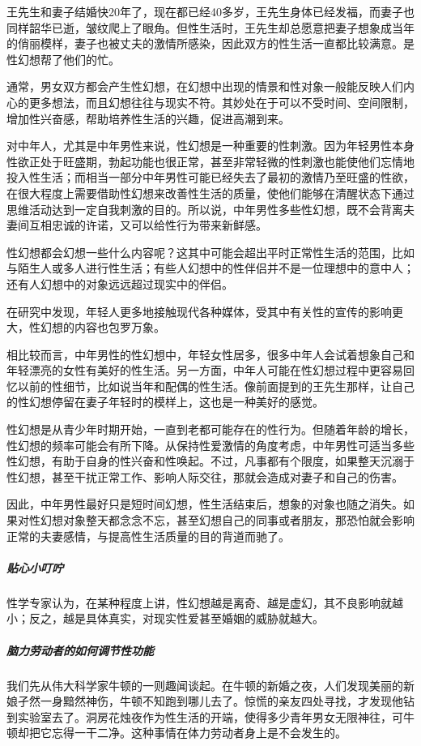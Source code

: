 王先生和妻子结婚快20年了，现在都已经40多岁，王先生身体已经发福，而妻子也同样韶华已逝，皱纹爬上了眼角。但性生活时，王先生却总愿意把妻子想象成当年的俏丽模样，妻子也被丈夫的激情所感染，因此双方的性生活一直都比较满意。是性幻想帮了他们的忙。

通常，男女双方都会产生性幻想，在幻想中出现的情景和性对象一般能反映人们内心的更多想法，而且幻想往往与现实不符。其妙处在于可以不受时间、空间限制，增加性兴奋感，帮助培养性生活的兴趣，促进高潮到来。

对中年人，尤其是中年男性来说，性幻想是一种重要的性刺激。因为年轻男性本身性欲正处于旺盛期，勃起功能也很正常，甚至非常轻微的性刺激也能使他们忘情地投入性生活；而相当一部分中年男性可能已经失去了最初的激情乃至旺盛的性欲，在很大程度上需要借助性幻想来改善性生活的质量，使他们能够在清醒状态下通过思维活动达到一定自我刺激的目的。所以说，中年男性多些性幻想，既不会背离夫妻间互相忠诚的许诺，又可以给性行为带来新鲜感。

性幻想都会幻想一些什么内容呢？这其中可能会超出平时正常性生活的范围，比如与陌生人或多人进行性生活；有些人幻想中的性伴侣并不是一位理想中的意中人；还有人幻想中的对象远远超过现实中的伴侣。

在研究中发现，年轻人更多地接触现代各种媒体，受其中有关性的宣传的影响更大，性幻想的内容也包罗万象。

相比较而言，中年男性的性幻想中，年轻女性居多，很多中年人会试着想象自己和年轻漂亮的女性有美好的性生活。另一方面，中年人可能在性幻想过程中更容易回忆以前的性细节，比如说当年和配偶的性生活。像前面提到的王先生那样，让自己的性幻想停留在妻子年轻时的模样上，这也是一种美好的感觉。

性幻想是从青少年时期开始，一直到老都可能存在的性行为。但随着年龄的增长，性幻想的频率可能会有所下降。从保持性爱激情的角度考虑，中年男性可适当多些性幻想，有助于自身的性兴奋和性唤起。不过，凡事都有个限度，如果整天沉溺于性幻想，甚至干扰正常工作、影响人际交往，那就会造成对妻子和自己的伤害。

因此，中年男性最好只是短时间幻想，性生活结束后，想象的对象也随之消失。如果对性幻想对象整天都念念不忘，甚至幻想自己的同事或者朋友，那恐怕就会影响正常的夫妻感情，与提高性生活质量的目的背道而驰了。

\subparagraph{贴心小叮咛}

性学专家认为，在某种程度上讲，性幻想越是离奇、越是虚幻，其不良影响就越小；反之，越是具体真实，对现实性爱甚至婚姻的威胁就越大。

\subparagraph{脑力劳动者的如何调节性功能}

我们先从伟大科学家牛顿的一则趣闻谈起。在牛顿的新婚之夜，人们发现美丽的新娘孑然一身黯然神伤，牛顿不知跑到哪儿去了。惊慌的亲友四处寻找，才发现他钻到实验室去了。洞房花烛夜作为性生活的开端，使得多少青年男女无限神往，可牛顿却把它忘得一干二净。这种事情在体力劳动者身上是不会发生的。

